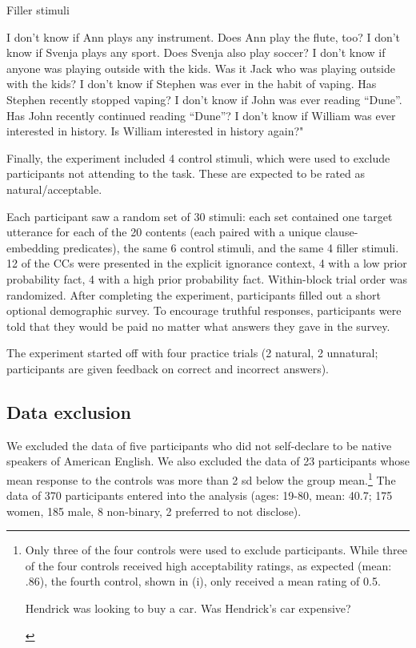 \documentclass[11pt,fleqn]{article}
\newcommand{\6}{\mbox{$[\hspace*{-.6mm}[$}}
\newcommand{\9}{\mbox{$]\hspace*{-.6mm}]$}}
\begin{document}
\begin{exe}
\ex Filler stimuli
\begin{xlist}
\ex I don't know if Ann plays any instrument. Does Ann play the flute, too?
\ex I don't know if Svenja plays any sport. Does Svenja also play soccer?
\ex I don't know if anyone was playing outside with the kids. Was it Jack who was playing outside with the kids?
\ex I don't know if Stephen was ever in the habit of vaping. Has Stephen recently stopped vaping?
\ex I don't know if John was ever reading ``Dune''. Has John recently continued reading ``Dune''?
\ex I don't know if William was ever interested in history. Is William interested in history again?"
\end{xlist}
\end{exe}

Finally, the experiment included 4 control stimuli, which were used to exclude participants not attending to the task. These are expected to be rated as natural/acceptable.

Each participant saw a random set of 30 stimuli: each set contained one target utterance for each of the 20 contents (each paired with a unique clause-embedding predicates), the same 6 control stimuli, and the same 4  filler stimuli. 12 of the CCs were presented in the explicit ignorance context, 4 with a low prior probability fact, 4 with a high prior probability fact. Within-block trial order was randomized. After completing the experiment, participants filled out a short optional demographic survey. To encourage truthful responses, participants were told that they would be paid no matter what answers they gave in the survey.

The experiment started off with four practice trials (2 natural, 2 unnatural; participants are given feedback on correct and incorrect answers).


\subsection{Data exclusion} 

We excluded the data of five participants who did not self-declare to be native speakers of American English. We also excluded the data of 23 participants whose mean response to the controls was more than 2 sd below the group mean.\footnote{Only three of the four controls were used to exclude participants. While three of the four controls received high acceptability ratings, as expected (mean: .86), the fourth control, shown in (i), only received a mean rating of 0.5. 
\begin{exe}
 Hendrick was looking to buy a car. Was Hendrick's car expensive?
\end{exe}
} The data of 370 participants entered into the analysis (ages: 19-80, mean: 40.7; 175 women, 185 male, 8 non-binary, 2 preferred to not disclose). 
\end{document}
